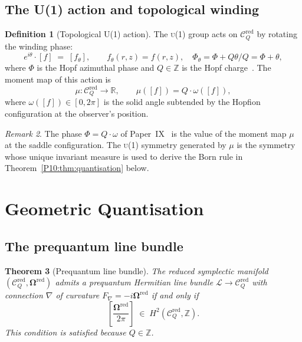 \documentclass[11pt,a4paper]{article}
\newtheorem{theorem}{Theorem}[section]
\theoremstyle{definition}
\newtheorem{definition}[theorem]{Definition}
\theoremstyle{remark}
\newtheorem{remark}[theorem]{Remark}
\newcommand{\RR}{\mathbb{R}}
\newcommand{\ZZ}{\mathbb{Z}}
\newcommand{\CQr}{\mathcal{C}_Q^{\mathrm{red}}}
\newcommand{\bOmega}{\boldsymbol{\Omega}}
\begin{document}
\subsection{The U(1) action and topological winding}

\begin{definition}[Topological U(1) action]
\label{P10:def:U1}
The \textsc{u}(1) group acts on $\CQr$ by rotating the
winding phase:
\begin{equation}
  e^{i\theta}\cdot [f]
  \;=\; [f_\theta],
  \qquad
  f_\theta(r,z) = f(r,z),\quad
  \Phi_\theta = \Phi + Q\theta/Q = \Phi + \theta,
  \label{P10:eq:U1_action}
\end{equation}
where $\Phi$ is the Hopf azimuthal phase and $Q\in\ZZ$ is the
Hopf charge~\cite{Paper1,Paper9}.
The moment map of this action is
\begin{equation}
  \mu: \CQr \to \RR,
  \qquad
  \mu([f]) = Q\cdot\omega([f]),
  \label{P10:eq:moment}
\end{equation}
where $\omega([f])\in[0,2\pi]$ is the solid angle subtended by
the Hopfion configuration at the observer's position.
\end{definition}

\begin{remark}
\label{P10:rem:phase_moment_map}
The phase $\Phi = Q\cdot\omega$ of Paper~IX~\cite{Paper9} is the
value of the moment map $\mu$ at the saddle configuration.
The \textsc{u}(1) symmetry generated by $\mu$ is the symmetry whose
unique invariant measure is used to derive the Born rule in
Theorem~\ref{P10:thm:quantisation} below.
\end{remark}

\section{Geometric Quantisation}
\label{P10:sec:quantisation}

\subsection{The prequantum line bundle}

\begin{theorem}[Prequantum line bundle]
\label{P10:thm:prequantum}
The reduced symplectic manifold $(\CQr,\bOmega^{\mathrm{red}})$
admits a prequantum Hermitian line bundle
$\mathcal{L}\to\CQr$ with connection $\nabla$ of curvature
$F_\nabla = -i\bOmega^{\mathrm{red}}$
if and only if
\begin{equation}
  \left[\frac{\bOmega^{\mathrm{red}}}{2\pi}\right]
  \;\in\; H^2(\CQr,\ZZ).
  \label{P10:eq:weil}
\end{equation}
This condition is satisfied because $Q\in\ZZ$.
\end{theorem}
\end{document}
